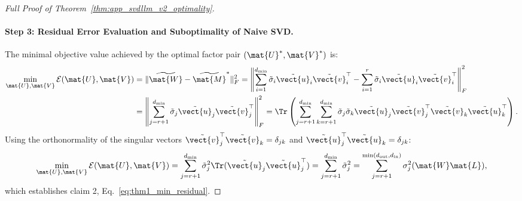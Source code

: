 \begin{proof}[Full Proof of Theorem~\ref{thm:app_svdllm_v2_optimality}]
\paragraph{Step 3: Residual Error Evaluation and Suboptimality of Naive SVD.}
The minimal objective value achieved by the optimal factor pair $(\mat{U}^*, \mat{V}^*)$ is:
\begin{align}
\min_{\mat{U}, \mat{V}} \mathcal{E}(\mat{U}, \mat{V}) &= \|\widetilde{\mat{W}} - \widetilde{\mat{M}}^*\|_F^2 = \left\| \sum_{i=1}^{d_{\min}} \tilde{\sigma}_i \tilde{\vect{u}}_i \tilde{\vect{v}}_i^\top - \sum_{i=1}^r \tilde{\sigma}_i \tilde{\vect{u}}_i \tilde{\vect{v}}_i^\top \right\|_F^2 \nonumber \\
&= \left\| \sum_{j=r+1}^{d_{\min}} \tilde{\sigma}_j \tilde{\vect{u}}_j \tilde{\vect{v}}_j^\top \right\|_F^2 = \Tr\left( \sum_{j=r+1}^{d_{\min}} \sum_{k=r+1}^{d_{\min}} \tilde{\sigma}_j \tilde{\sigma}_k \tilde{\vect{u}}_j \tilde{\vect{v}}_j^\top \tilde{\vect{v}}_k \tilde{\vect{u}}_k^\top \right).
\end{align}
Using the orthonormality of the singular vectors $\tilde{\vect{v}}_j^\top \tilde{\vect{v}}_k = \delta_{jk}$ and $\tilde{\vect{u}}_j^\top \tilde{\vect{u}}_k = \delta_{jk}$:
\begin{equation}
\min_{\mat{U}, \mat{V}} \mathcal{E}(\mat{U}, \mat{V}) = \sum_{j=r+1}^{d_{\min}} \tilde{\sigma}_j^2 \Tr(\tilde{\vect{u}}_j \tilde{\vect{u}}_j^\top) = \sum_{j=r+1}^{d_{\min}} \tilde{\sigma}_j^2 = \sum_{j=r+1}^{\min(d_{\text{out}}, d_{\text{in}})} \sigma_j^2(\mat{W} \mat{L}),
\end{equation}
which establishes claim 2, Eq.~\eqref{eq:thm1_min_residual}.


\end{proof}
